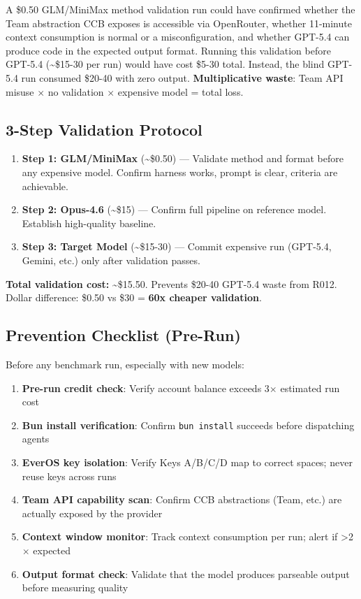 \documentclass[11pt, a4paper]{article}
\begin{document}
\begin{evidence}
A \$0.50 GLM/MiniMax method validation run could have confirmed whether the Team abstraction CCB exposes is accessible via OpenRouter, whether 11-minute context consumption is normal or a misconfiguration, and whether GPT-5.4 can produce code in the expected output format. Running this validation before GPT-5.4 (\textasciitilde\$15-30 per run) would have cost \$5-30 total. Instead, the blind GPT-5.4 run consumed \$20-40 with zero output. \textbf{Multiplicative waste}: Team API misuse $\times$ no validation $\times$ expensive model = total loss.
\end{evidence}

\subsection{3-Step Validation Protocol}

\begin{enumerate}
  \item \textbf{Step 1: GLM/MiniMax} (\textasciitilde\$0.50) --- Validate method and format before any expensive model. Confirm harness works, prompt is clear, criteria are achievable.
  \item \textbf{Step 2: Opus-4.6} (\textasciitilde\$15) --- Confirm full pipeline on reference model. Establish high-quality baseline.
  \item \textbf{Step 3: Target Model} (\textasciitilde\$15-30) --- Commit expensive run (GPT-5.4, Gemini, etc.) only after validation passes.
\end{enumerate}

\textbf{Total validation cost:} \textasciitilde\$15.50. Prevents \$20-40 GPT-5.4 waste from R012. Dollar difference: \$0.50 vs \$30 = \textbf{60x cheaper validation}.

\subsection{Prevention Checklist (Pre-Run)}

Before any benchmark run, especially with new models:
\begin{enumerate}
  \item \textbf{Pre-run credit check}: Verify account balance exceeds 3$\times$ estimated run cost
  \item \textbf{Bun install verification}: Confirm \texttt{bun install} succeeds before dispatching agents
  \item \textbf{EverOS key isolation}: Verify Keys A/B/C/D map to correct spaces; never reuse keys across runs
  \item \textbf{Team API capability scan}: Confirm CCB abstractions (Team, etc.) are actually exposed by the provider
  \item \textbf{Context window monitor}: Track context consumption per run; alert if >2$\times$ expected
  \item \textbf{Output format check}: Validate that the model produces parseable output before measuring quality
\end{enumerate}
\end{document}
